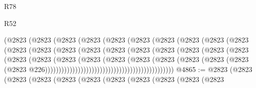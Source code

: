 \begin{lexlean}{R78}
\begin{lexlean}{R52}
\begin{coremodule}
{{{{{{{{{{{{{{{{{{{{{{{{{{{{{{{{{{{{{{{{{{{{{{{{{{{{{{{{{{{{{{{{{{{{{{{{{{{{{{{{{{{{{{{{{{{{{{{{{{{{{{{{{{{{{{{{{{{{{{{{{{{{{{{{{{{{{{{{{{{{{{{{{{{{{{{{{{{{{{{{{{{{{{{{{{{{{{{{{{{{{{{{{{{{{{{{{{{{{{                                    (@2823
                                      (@2823
                                        (@2823
                                          (@2823
                                            (@2823
                                              (@2823
                                                (@2823
                                                  (@2823
                                                    (@2823
                                                      (@2823
                                                        (@2823
                                                          (@2823
                                                            (@2823
                                                              (@2823
                                                                (@2823
                                                                  (@2823
                                                                    (@2823
                                                                      (@2823
                                                                        (@2823
                                                                          (@2823
                                                                            (@2823
                                                                              (@2823
                                                                                (@2823
                                                                                  (@2823
                                                                                    (@2823
                                                                                      (@2823
                                                                                        (@2823
                                                                                          (@2823
                                                                                            (@2823
                                                                                              (@2823
                                                                                                (@2823
                                                                                                  @226)))))))))))))))))))))))))))))))))))))))))))))))
@4865 := @2823
    (@2823
      (@2823
        (@2823
          (@2823
            (@2823
              (@2823
                (@2823
                  (@2823
                    (@2823
                      (@2823
}}}}}}}}}}}}}}}}}}}}}}}}}}}}}}}}}}}}}}}}}}}}}}}}}}}}}}}}}}}}}}}}}}}}}}}}}}}}}}}}}}}}}}}}}}}}}}}}}}}}}}}}}}}}}}}}}}}}}}}}}}}}}}}}}}}}}}}}}}}}}}}}}}}}}}}}}}}}}}}}}}}}}}}}}}}}}}}}}}}}}}}}}}}}}}}}}}}}}}
\end{coremodule}
\end{lexlean}
\end{lexlean}
